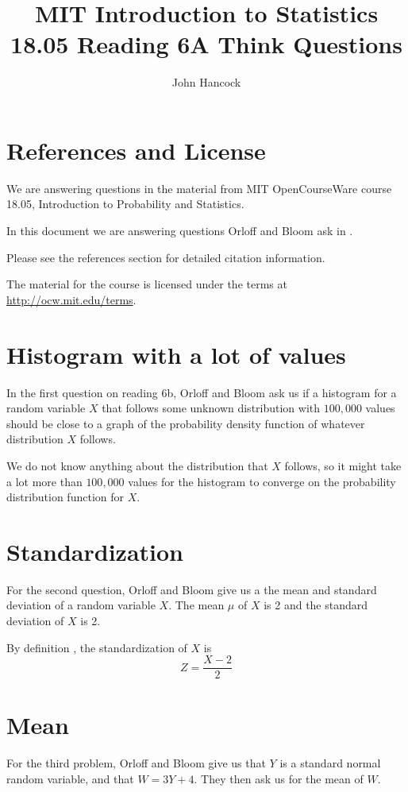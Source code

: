 \documentclass[a4paper,11pt]{article}
\author{John Hancock}
\title{MIT Introduction to Statistics 18.05 Reading 6A Think Questions }
\begin{document}
\maketitle
\tableofcontents
\section{References and License}
We are answering questions in the material from MIT OpenCourseWare
course 18.05, Introduction to Probability and Statistics.

In this document we are answering questions Orloff and Bloom ask in
\cite{reading6bQu}.

Please see the references section for detailed citation information.

The material for the course is licensed under the terms at
\url{http://ocw.mit.edu/terms}.

\section{Histogram with a lot of values}
In the first question on reading 6b, Orloff and Bloom ask us if a histogram
for a random variable $X$ that follows some unknown distribution with $100,000$
values should be close to a graph of the probability density function of
whatever distribution $X$ follows.

We do not know anything about the distribution that $X$ follows, so it might
take a lot more than $100,000$ values for the histogram to converge on the
probability distribution function for $X$.

\section{Standardization}

For the second question, Orloff and Bloom give us a the mean and standard
deviation of a random variable $X$.  The mean $\mu$ of $X$ is 2 and the
standard deviation of $X$ is 2.

By definition \cite{reading6b}, the standardization of $X$ is
\begin{equation}
  Z = \frac{X-2}{2}
\end{equation}

\section{Mean}
For the third problem, Orloff and Bloom give us that $Y$ is a standard normal
random variable, and that $W=3Y+4$.  They then ask us for the mean of $W$.
\end{document}
